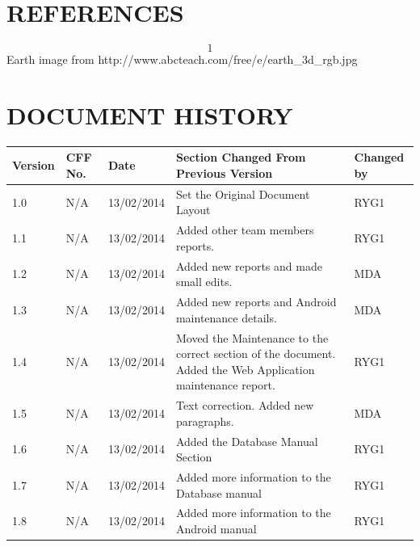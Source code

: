 \documentclass[12pt]{article}
\begin{document}
\section{REFERENCES}
\[1\]Earth image from http://www.abcteach.com/free/e/earth\_3d\_rgb.jpg

\newpage
\section{DOCUMENT HISTORY}
\setlength\LTleft{-0.5cm}
\begin{longtable}{|p{1.3cm}|p{1.5cm}|p{2cm}|p{7cm}| p{2cm}|}
\hline
	Version & CFF No. & Date & Section Changed From Previous Version & Changed by \\
\hline
	1.0&N/A&13/02/2014&Set the Original Document Layout&RYG1
 \\ 
\hline
	1.1&N/A&13/02/2014&Added other team members reports.&RYG1 \\
\hline
	1.2&N/A&13/02/2014&Added new reports and made small edits.&MDA \\
	\hline
	1.3&N/A&13/02/2014&Added new reports and Android maintenance details.&MDA \\
\hline
	1.4&N/A&13/02/2014&Moved the Maintenance to the correct section of the document. Added the Web Application maintenance report.&RYG1 \\
\hline
	1.5&N/A&13/02/2014&Text correction. Added new paragraphs.&MDA \\
\hline	
	1.6&N/A&13/02/2014&Added the Database Manual Section&RYG1 \\
\hline
	1.7&N/A&13/02/2014&Added more information to the Database manual&RYG1 \\
\hline		
	1.8&N/A&13/02/2014&Added more information to the Android manual&RYG1 \\
	\hline
\end{longtable}
\end{document}
